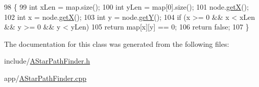 \begin{DoxyCode}
98                                                                       \{
99   \textcolor{keywordtype}{int} xLen = map.size();
100   \textcolor{keywordtype}{int} yLen = map[0].size();
101   node.\hyperlink{classNode_aa45b6294ee8c7aafdf5a1450f879c598}{getX}();
102   \textcolor{keywordtype}{int} x = node.\hyperlink{classNode_aa45b6294ee8c7aafdf5a1450f879c598}{getX}();
103   \textcolor{keywordtype}{int} y = node.\hyperlink{classNode_a81610ad138e2ac2cca79603032aaafc1}{getY}();
104   \textcolor{keywordflow}{if} (x >= 0 && x < xLen && y >= 0 && y < yLen)
105     \textcolor{keywordflow}{return} map[x][y] == 0;
106   \textcolor{keywordflow}{return} \textcolor{keyword}{false};
107 \}
\end{DoxyCode}


The documentation for this class was generated from the following files\+:\begin{DoxyCompactItemize}
\item 
include/\hyperlink{AStarPathFinder_8h}{A\+Star\+Path\+Finder.\+h}\item 
app/\hyperlink{AStarPathFinder_8cpp}{A\+Star\+Path\+Finder.\+cpp}\end{DoxyCompactItemize}
